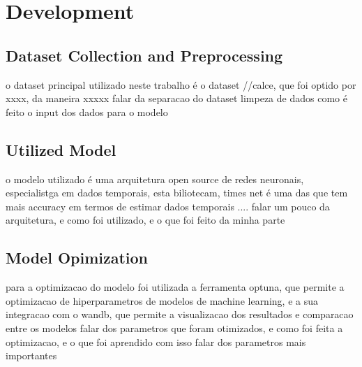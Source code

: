 \chapter{Development}
\label{ch:Development}
\lipsum[1]
\section{Dataset Collection and Preprocessing}

o dataset principal utilizado neste trabalho é o dataset //calce, que foi optido por xxxx, da maneira xxxxx
falar da separacao do dataset
limpeza de dados
como é feito o input dos dados para o modelo
\section{Utilized Model}
o modelo utilizado é uma arquitetura open source de redes neuronais, especialistga em dados temporais, esta biliotecam, times net é uma das que tem mais accuracy em termos de estimar dados temporais
.... falar um pouco da arquitetura, e como foi utilizado, e o que foi feito da minha parte

\section{Model Opimization}
para a optimizacao do modelo foi utilizada a ferramenta optuna, que permite a optimizacao de hiperparametros de modelos de machine learning, e a sua integracao com o wandb, que permite a visualizacao dos resultados e comparacao entre os modelos
falar dos parametros que foram otimizados, e como foi feita a optimizacao, e o que foi aprendido com isso
falar dos parametros mais importantes
